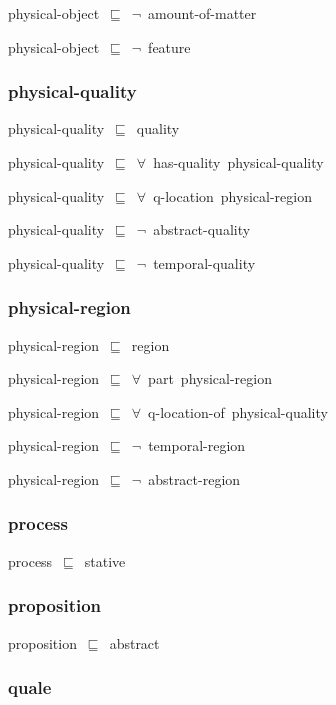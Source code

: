 \documentclass{article}
\begin{document}
physical-object~\ensuremath{\sqsubseteq}~\ensuremath{\lnot}~amount-of-matter

physical-object~\ensuremath{\sqsubseteq}~\ensuremath{\lnot}~feature

\subsubsection*{physical-quality}

physical-quality~\ensuremath{\sqsubseteq}~quality~

physical-quality~\ensuremath{\sqsubseteq}~\ensuremath{\forall}~has-quality~physical-quality~

physical-quality~\ensuremath{\sqsubseteq}~\ensuremath{\forall}~q-location~physical-region~

physical-quality~\ensuremath{\sqsubseteq}~\ensuremath{\lnot}~abstract-quality

physical-quality~\ensuremath{\sqsubseteq}~\ensuremath{\lnot}~temporal-quality

\subsubsection*{physical-region}

physical-region~\ensuremath{\sqsubseteq}~region~

physical-region~\ensuremath{\sqsubseteq}~\ensuremath{\forall}~part~physical-region~

physical-region~\ensuremath{\sqsubseteq}~\ensuremath{\forall}~q-location-of~physical-quality~

physical-region~\ensuremath{\sqsubseteq}~\ensuremath{\lnot}~temporal-region

physical-region~\ensuremath{\sqsubseteq}~\ensuremath{\lnot}~abstract-region

\subsubsection*{process}

process~\ensuremath{\sqsubseteq}~stative~

\subsubsection*{proposition}

proposition~\ensuremath{\sqsubseteq}~abstract~

\subsubsection*{quale}
\end{document}
